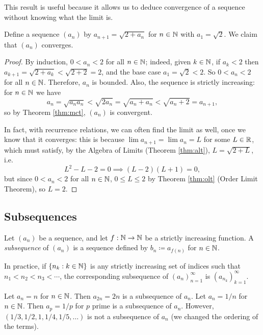 \documentclass[../analysis1.tex]{subfiles}
\begin{document}
\begin{remark}
    This result is useful because it allows us to deduce convergence of a sequence without knowing what the limit is.
\end{remark}
\begin{example}
    Define a sequence $(a_n)$ by $a_{n+1}=\sqrt{2+a_n}$ for $n\in\mathbb{N}$ with $a_1=\sqrt{2}$. We claim that $(a_n)$ converges.
\end{example}
\begin{proof}
    By induction, $0<a_n<2$ for all $n\in\mathbb{N}$; indeed, given $k\in\mathbb{N}$, if $a_k<2$ then $a_{k+1}=\sqrt{2+a_k}<\sqrt{2+2}=2$, and the base case $a_1=\sqrt{2}<2$. So $0<a_n<2$ for all $n\in\mathbb{N}$. Therefore, $a_n$ is bounded.
    Also, the sequence is strictly increasing: for $n\in\mathbb{N}$ we have $$a_n=\sqrt{a_na_n}<\sqrt{2a_n}=\sqrt{a_n+a_n}<\sqrt{a_n+2}=a_{n+1},$$
    so by Theorem \ref{thm:mct}, $(a_n)$ is convergent.\par
    In fact, with recurrence relations, we can often find the limit as well, once we know that it converges: this is because $\lim a_{n+1}=\lim a_n=L$ for some $L\in\mathbb{R}$, which must satisfy, by the Algebra of Limits (Theorem \ref{thm:alt}), $L=\sqrt{2+L}$, i.e. $$L^2-L-2=0\implies (L-2)(L+1)=0,$$
    but since $0<a_n<2$ for all $n\in\mathbb{N}$, $0\le L\le 2$ by Theorem \ref{thm:olt} (Order Limit Theorem), so $L=2$. 
\end{proof}

\subsection{Subsequences}
\begin{definition}
    \begin{shaded*}
        Let $(a_n)$ be a sequence, and let $f:\mathbb{N}\to\mathbb{N}$ be a strictly increasing function. A \textit{subsequence} of $(a_n)$ is a sequence defined by $b_n\coloneqq a_{f(n)}$ for $n\in\mathbb{N}$.
    \end{shaded*}
\end{definition}
\begin{remark}
    In practice, if $\{n_k:k\in\mathbb{N}\}$ is any strictly increasing set of indices such that $n_1<n_2<n_3<\cdots$, the corresponding subsequence of $(a_n)_{n=1}^{\infty}$ is $(a_{n_k})_{k=1}^{\infty}$.
\end{remark}
\begin{example}
    Let $a_n=n$ for $n\in\mathbb{N}$. Then $a_{2n}=2n$ is a subsequence of $a_n$. Let $a_n=1/n$ for $n\in\mathbb{N}$. Then $a_p=1/p$ for $p$ prime is a subsequence of $a_n$. However, $(1/3,1/2,1,1/4,1/5,\dots)$ is not a subsequence of $a_n$ (we changed the ordering of the terms).
\end{example}
\end{document}
